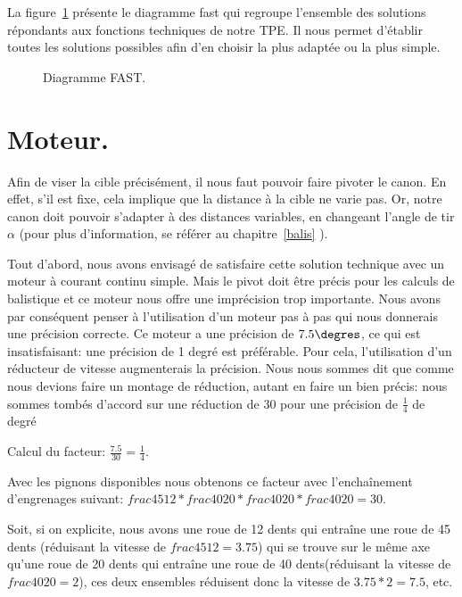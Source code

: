 La figure~\ref{fast} présente le diagramme fast qui regroupe l'ensemble des solutions répondants aux fonctions techniques de notre TPE. Il nous permet d'établir toutes les solutions possibles afin d'en choisir la plus adaptée ou la plus simple. 

\begin{figure}
	\begin{center}
		
	\end{center}
	\caption{Diagramme FAST.}
	\label{fast}
\end{figure}

\section{Moteur.}
Afin de viser la cible précisément, il nous faut pouvoir faire pivoter le canon. En effet, s'il est fixe, cela implique que la distance à la cible ne varie pas. Or, notre canon doit pouvoir s'adapter à des distances variables, en changeant l'angle de tir $\alpha$ (pour plus d'information, se référer au chapitre~\ref{balis}  ). 

Tout d'abord, nous avons envisagé de satisfaire cette solution technique avec un moteur à courant continu simple. Mais le pivot doit être précis pour les calculs de balistique et ce moteur nous offre une imprécision trop importante. Nous avons par conséquent penser à l'utilisation d'un moteur pas à pas qui nous donnerais une précision correcte. Ce moteur a une précision de $7.5\degres$, ce qui est insatisfaisant: une précision de 1 degré est préférable. Pour cela, l'utilisation d'un réducteur de vitesse augmenterais la précision. Nous nous sommes dit que comme nous devions faire un montage de réduction, autant en faire un bien précis: nous sommes tombés d'accord sur une réduction de 30 pour une précision de $\frac{1}{4}$ de degré

Calcul du facteur: $\frac{7.5}{30} = \frac{1}{4}$.

Avec les pignons disponibles nous obtenons ce facteur avec l'enchaînement d'engrenages suivant:  $frac{45}{12} * frac{40}{20} * frac{40}{20} * frac{40}{20} = 30$.

Soit, si on explicite, nous avons une roue de 12 dents qui entraîne une roue de 45 dents (réduisant la vitesse de $frac{45}{12} = 3.75$) qui se trouve sur le même axe qu'une roue de 20 dents qui entraîne une roue de 40 dents(réduisant la vitesse de $frac{40}{20} = 2$), ces deux ensembles réduisent donc la vitesse de $3.75 * 2 = 7.5$, etc.

